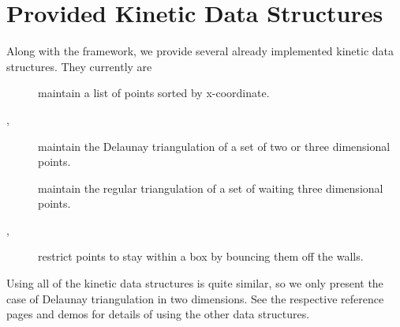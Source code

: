 \section{Provided Kinetic Data Structures}
\label{sec:provided_kdss}

Along with the framework, we provide several already implemented kinetic data structures. They currently are 
\begin{description}
\item[] maintain a list of points sorted by x-coordinate.
\item[,] maintain the Delaunay triangulation of a set of two or three dimensional points.
\item[] maintain the regular triangulation of a set of waiting three dimensional points.
\item[, ] restrict points to stay within a box by bouncing them off the walls.
\end{description}

Using all of the kinetic data structures is quite similar, so we only
present the case of Delaunay triangulation in two dimensions. See the
respective reference pages and demos for details of using the other
data structures.




